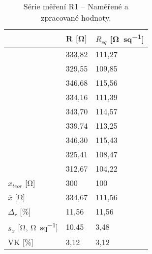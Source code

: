 \begin{table}[h!]
    \caption{Série měření R1 -- Naměřené a zpracované hodnoty.}
    \centering
    \def\arraystretch{1.4}
    \begin{tabular}{l|l|l}
                            & R [\unit{\ohm}]    & \(R_{sq}\) [\unit{\ohm\per sq}]  \\ \hline\hline
                            & 333,82 & 111,27 \\ \hline
                            & 329,55 & 109,85 \\ \hline
                            & 346,68 & 115,56 \\ \hline
                            & 334,16 & 111,39 \\ \hline
                            & 343,70 & 114,57 \\ \hline
                            & 339,74 & 113,25 \\ \hline
                            & 346,30 & 115,43 \\ \hline
                            & 325,41 & 108,47 \\ \hline
                            & 312,67 & 104,22 \\ \hline\hline
        \(x_{teor} \) [\unit{\ohm}]      & 300    & 100    \\ \hline
        \(\overline{x} \) [\unit{\ohm}]  & 334,67 & 111,56 \\ \hline
        \(\Delta_{r} \) [\unit{\percent}]    & 11,56& 11,56\\ \hline\hline
        \(s_{x} \) [\unit{\ohm}, \unit{\ohm\per sq}]         & 10,45  & 3,48   \\ \hline
        VK [\unit{\percent}]                 & 3,12 & 3,12 \\ 
    \end{tabular}
    \label{tab:r1_hodnoty}
\end{table}

